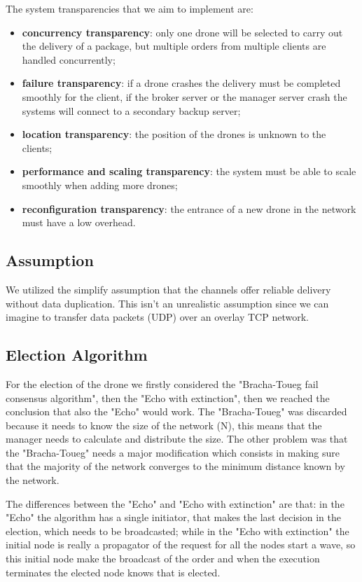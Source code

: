 \documentclass[a4paper, oneside]{memoir}
\begin{document}
The system transparencies that we aim to implement are:
\begin{itemize}
	\item \textbf{concurrency transparency}: only one drone will be selected to carry out the delivery of a package, but multiple orders from multiple clients are handled concurrently;
	\item \textbf{failure transparency}: if a drone crashes the delivery must be completed smoothly for the client, if the broker server or the manager server crash the systems will connect to a secondary backup server;
	\item \textbf{location transparency}: the position of the drones is unknown to the clients;
	\item \textbf{performance and scaling transparency}: the system must be able to scale smoothly when adding more drones;
	\item \textbf{reconfiguration transparency}: the entrance of a new drone in the network must have a low overhead.
\end{itemize}

\subsection{Assumption}
We utilized the simplify assumption that the channels offer reliable delivery without data duplication. This isn't an unrealistic assumption since we can imagine to transfer data packets (UDP) over an overlay TCP network.

\subsection{Election Algorithm}
For the election of the drone we firstly considered the "Bracha-Toueg fail consensus algorithm", then the "Echo with extinction", then we reached the conclusion that also the "Echo" would work. The "Bracha-Toueg" was discarded because it needs to know the size of the network (N), this means that the manager needs to calculate and distribute the size. The other problem was that the "Bracha-Toueg" needs a major modification which consists in making sure that the majority of the network converges to the minimum distance known by the network.

The differences between the "Echo" and "Echo with extinction" are that: in the "Echo" the algorithm has a single initiator, that makes the last decision in the election, which needs to be broadcasted; while in the "Echo with extinction" the initial node is really a propagator of the request for all the nodes start a wave, so this initial node make the broadcast of the order and when the execution terminates the elected node knows that is elected.
\end{document}
